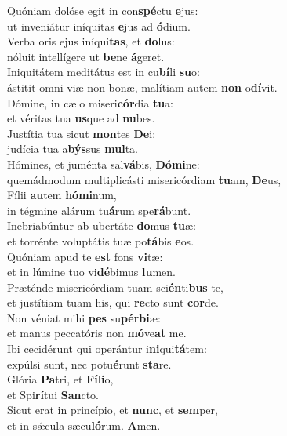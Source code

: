 \evenverse Quóniam dolóse egit in con\textbf{spé}ctu \textbf{e}jus:~\*\\
\evenverse ut inveniátur iníquitas \textbf{e}jus ad \textbf{ó}dium.\\
\oddverse Verba oris ejus iníqui\textbf{tas}, et \textbf{do}lus:~\*\\
\oddverse nóluit intellígere ut \textbf{be}ne \textbf{á}geret.\\
\evenverse Iniquitátem meditátus est in cu\textbf{bí}li \textbf{su}o:~\*\\
\evenverse ástitit omni viæ non bonæ, malítiam autem \textbf{non} o\textbf{dí}vit.\\
\oddverse Dómine, in cælo miseri\textbf{cór}dia \textbf{tu}a:~\*\\
\oddverse et véritas tua \textbf{us}que ad \textbf{nu}bes.\\
\evenverse Justítia tua sicut \textbf{mon}tes \textbf{De}i:~\*\\
\evenverse judícia tua a\textbf{býs}sus \textbf{mul}ta.\\
\oddverse Hómines, et juménta sal\textbf{vá}bis, \textbf{Dó}\textbf{mi}ne:~\*\\
\oddverse quemádmodum multiplicásti misericórdiam \textbf{tu}am, \textbf{De}us,\\
\evenverse Fílii \textbf{au}tem \textbf{hó}\textbf{mi}num,~\*\\
\evenverse in tégmine alárum tu\textbf{á}rum spe\textbf{rá}bunt.\\
\oddverse Inebriabúntur ab ubertáte \textbf{do}mus \textbf{tu}æ:~\*\\
\oddverse et torrénte voluptátis tuæ po\textbf{tá}bis \textbf{e}os.\\
\evenverse Quóniam apud te \textbf{est} fons \textbf{vi}tæ:~\*\\
\evenverse et in lúmine tuo vi\textbf{dé}bimus \textbf{lu}men.\\
\oddverse Præténde misericórdiam tuam sci\textbf{én}ti\textbf{bus} te,~\*\\
\oddverse et justítiam tuam his, qui \textbf{re}cto sunt \textbf{cor}de.\\
\evenverse Non véniat mihi \textbf{pes} su\textbf{pér}\textbf{bi}æ:~\*\\
\evenverse et manus peccatóris non \textbf{mó}ve\textbf{at} me.\\
\oddverse Ibi cecidérunt qui operántur i\textbf{ni}qui\textbf{tá}tem:~\*\\
\oddverse expúlsi sunt, nec potu\textbf{é}runt \textbf{sta}re.\\
\evenverse Glória \textbf{Pa}tri, et \textbf{Fí}\textbf{li}o,~\*\\
\evenverse et Spi\textbf{rí}tui \textbf{San}cto.\\
\oddverse Sicut erat in princípio, et \textbf{nunc}, et \textbf{sem}per,~\*\\
\oddverse et in sǽcula sæcu\textbf{ló}rum. \textbf{A}men.\\
